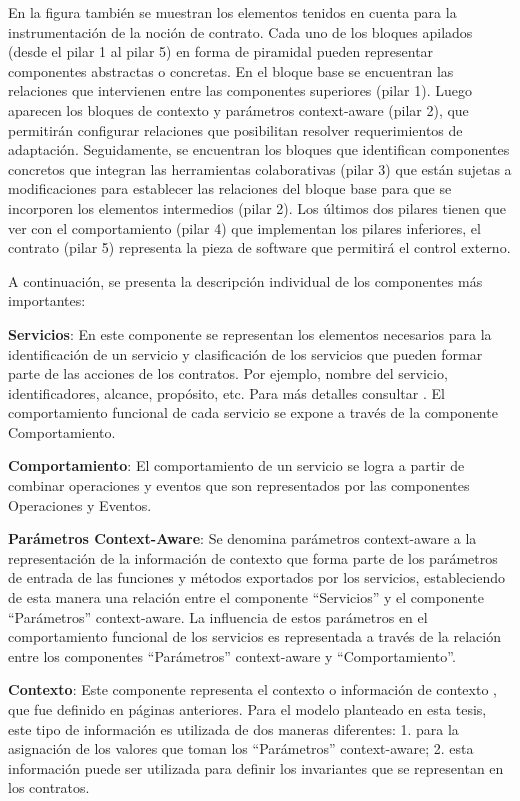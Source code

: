 En la figura también se muestran los elementos tenidos en cuenta
para la instrumentación de la noción de contrato. Cada uno de los bloques
apilados (desde el pilar 1 al pilar 5) en forma de piramidal pueden representar
componentes abstractas o concretas. En el bloque base se encuentran las
relaciones que intervienen entre las componentes superiores (pilar 1). Luego
aparecen los bloques de contexto y parámetros context-aware (pilar 2), que
permitirán configurar relaciones que posibilitan resolver requerimientos de
adaptación. Seguidamente, se encuentran los bloques que identifican componentes concretos que
integran las herramientas colaborativas (pilar 3) que están sujetas a
modificaciones para establecer las relaciones del bloque base para que se incorporen los
elementos intermedios (pilar 2). Los últimos dos pilares tienen que ver con el
comportamiento (pilar 4) que implementan los pilares inferiores, el contrato
(pilar 5) representa la pieza de software que permitirá el control externo. 

A continuación, se presenta la descripción individual de los componentes más importantes:

\textbf{Servicios}: En este componente se representan los elementos necesarios
para la identificación de un servicio y clasificación de los servicios que
pueden formar parte de las acciones de los contratos. Por ejemplo, nombre del
servicio, identificadores, alcance, propósito, etc. Para más detalles
consultar \cite{cap1.5}. El comportamiento funcional de cada servicio se
expone a través de la componente Comportamiento.

\textbf{Comportamiento}: El comportamiento de un servicio se logra a partir de
combinar operaciones y eventos que son representados por las componentes
Operaciones y Eventos. 

\textbf{Parámetros Context-Aware}: Se denomina parámetros context-aware a la
representación de la información de contexto que forma parte de los
parámetros de entrada de las funciones y métodos exportados por los servicios,
estableciendo de esta manera una relación entre el componente “Servicios” y el
componente “Parámetros” context-aware. La influencia de estos parámetros en el
comportamiento funcional de los servicios es representada a través de
la relación entre los componentes “Parámetros” context-aware y “Comportamiento”.

\textbf{Contexto}: Este componente representa el contexto o información de
contexto , que fue definido en páginas anteriores. Para el modelo planteado en esta tesis, este tipo
de información es utilizada de dos maneras diferentes: 1. para la
asignación de los valores que toman los “Parámetros” context-aware; 2. esta información puede ser utilizada para definir los invariantes que se
representan en los contratos.

